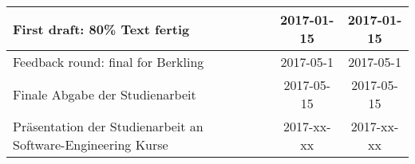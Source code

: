 \begin{minipage}{\textwidth}
\begin{tabular}{|p{6cm}|p{3cm}|c|c|}
First draft: 80\% Text fertig                                & \centering{Marc Mahler, Marvin Zerulla}                          & 2017-01-15          & 2017-01-15        \\ \hline
Feedback round: final for Berkling                           & \centering{Marc Mahler, Marvin Zerulla, Prof. PhD. Kay Berkling} & 2017-05-1           & 2017-05-1         \\ \hline
Finale Abgabe der Studienarbeit                              & \centering{Marc Mahler, Marvin Zerulla}                          &  2017-05-15          & 2017-05-15        \\ \hline
Präsentation der Studienarbeit an Software-Engineering Kurse & \centering{Marc Mahler, Marvin Zerulla, Prof. PhD. Kay Berkling} & 2017-xx-xx          & 2017-xx-xx        \\ \hline
\end{tabular}
\end{minipage}




